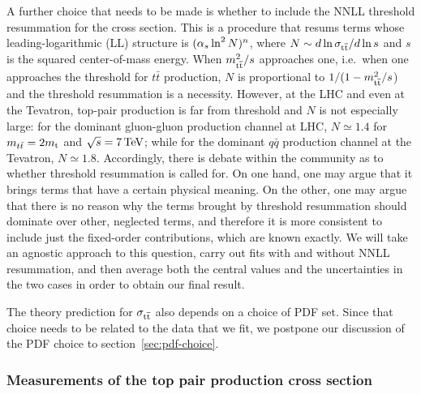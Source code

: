 A further choice that needs to be made is whether to include the NNLL
threshold resummation for the cross section.
%
This is a procedure that resums terms whose leading-logarithmic (LL)
structure is $(\alpha_s \ln^2 N)^n$, where $N \sim d\ln\sigma_{\mathrm{t}\overline{\mathrm{t}}}/d\ln s$ and
$s$ is the squared center-of-mass energy.
%
When $m_{\mathrm{t}\overline{\mathrm{t}}}^2/s$ approaches one, i.e.\ when one approaches the
threshold for $t\bar t$ production, $N$ is proportional to
$1/(1-m_{\mathrm{t}\overline{\mathrm{t}}}^2/s$) and the threshold resummation is a necessity.
%
However, at the LHC and even at the Tevatron, top-pair production is
far from threshold and $N$ is not especially large: for the dominant
gluon-gluon production channel at LHC, $N \simeq 1.4$ for
$m_{t\bar t} = 2 m_{\mathrm{t}}$ and $\sqrt{s} = 7\,\text{TeV}$; while for the dominant
$q\bar q$ production channel at the Tevatron, $N \simeq 1.8$.
%
Accordingly, there is debate within the community as to
whether threshold resummation is called for.
%
On one hand, one may argue that it brings terms that have a certain
physical meaning.
%
On the other, one may argue that there is no reason why the terms
brought by threshold resummation should dominate over other, neglected
terms, and therefore it is more consistent to include just the
fixed-order contributions, which are known exactly.
%
We will take an agnostic approach to this question, carry out fits
with and without NNLL resummation, and then average both the central
values and the uncertainties in the two cases in order to obtain our
final result.

The theory prediction for $\sigma_{\mathrm{t}\overline{\mathrm{t}}}$ also depends on a choice of PDF set.
%
Since that choice needs to be related to the data that we fit, we
postpone our discussion of the PDF choice to
section~\ref{sec:pdf-choice}.


\subsubsection{Measurements of the top pair production cross section}
\label{sec:data}

